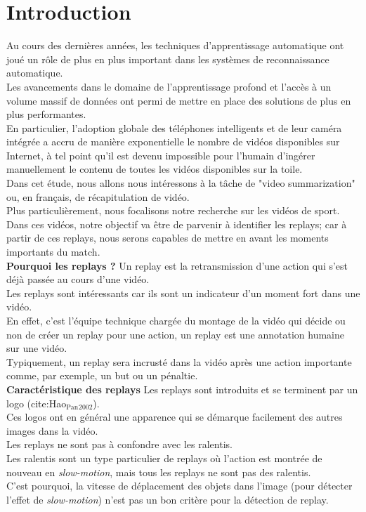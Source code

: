 \documentclass[11pt]{article}
\begin{document}
\section{Introduction}
\label{sec:org4b39333}
Au cours des dernières années, les techniques d'apprentissage automatique ont joué un rôle de plus en plus important dans les systèmes de reconnaissance automatique.\\
Les avancements dans le domaine de l'apprentissage profond et l'accès à un volume massif de données ont permi de mettre en place des solutions de plus en plus performantes.\\
En particulier, l'adoption globale des téléphones intelligents et de leur caméra intégrée a accru de manière exponentielle le nombre de vidéos disponibles sur Internet, à tel point qu'il est devenu impossible pour l'humain d'ingérer manuellement le contenu de toutes les vidéos disponibles sur la toile.\\
Dans cet étude, nous allons nous intéressons à la tâche de "video summarization" ou, en français, de récapitulation de vidéo.\\
Plus particulièrement, nous focalisons notre recherche sur les vidéos de sport.\\

Dans ces vidéos, notre objectif va être de parvenir à identifier les replays; car à partir de ces replays, nous serons capables de mettre en avant les moments importants du match.\\

\textbf{Pourquoi les replays ?} Un replay est la retransmission d'une action qui s'est déjà passée au cours d'une vidéo.\\
Les replays sont intéressants car ils sont un indicateur d'un moment fort dans une vidéo.\\
En effet, c'est l'équipe technique chargée du montage de la vidéo qui décide ou non de créer un replay pour une action, un replay est une annotation humaine sur une vidéo.\\
Typiquement, un replay sera incrusté dans la vidéo après une action importante comme, par exemple, un but ou un pénaltie.\\

\textbf{Caractéristique des replays} Les replays sont introduits et se terminent par un logo (cite:Hao\(_{\text{Pan}}\)\(_{\text{2002}}\)).\\
Ces logos ont en général une apparence qui se démarque facilement des autres images dans la vidéo.\\
Les replays ne sont pas à confondre avec les ralentis.\\
Les ralentis sont un type particulier de replays où l'action est montrée de nouveau en \emph{slow-motion}, mais tous les replays ne sont pas des ralentis.\\
C'est pourquoi, la vitesse de déplacement des objets dans l'image (pour détecter l'effet de \emph{slow-motion}) n'est pas un bon critère pour la détection de replay.\\
\end{document}
